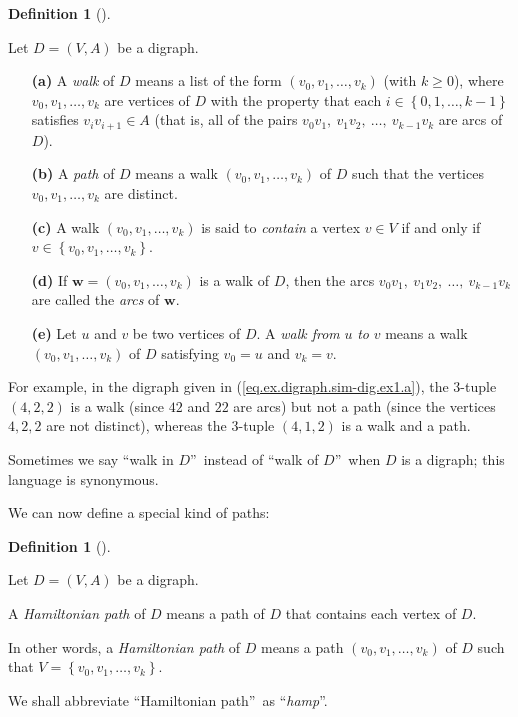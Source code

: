 \documentclass[numbers=enddot,12pt,final,onecolumn,notitlepage]{scrartcl}%
\numberwithin{exer}{subsection}
\theoremstyle{definition}
\newtheorem{defi}[theo]{Definition}
\newenvironment{definition}[1][]
{\begin{defi}[#1]\begin{leftbar}}
{\end{leftbar}\end{defi}}
\begin{document}
\begin{definition}
Let $D=\left(  V,A\right)  $ be a digraph.

\begin{enumerate}
\item[\textbf{(a)}] A \emph{walk} of $D$ means a list of the form $\left(
v_{0},v_{1},\ldots,v_{k}\right)  $ (with $k\geq0$), where $v_{0},v_{1}%
,\ldots,v_{k}$ are vertices of $D$ with the property that each $i\in\left\{
0,1,\ldots,k-1\right\}  $ satisfies $v_{i}v_{i+1}\in A$ (that is, all of the
pairs $v_{0}v_{1},\ v_{1}v_{2},\ \ldots,\ v_{k-1}v_{k}$ are arcs of $D$).

\item[\textbf{(b)}] A \emph{path} of $D$ means a walk $\left(  v_{0}%
,v_{1},\ldots,v_{k}\right)  $ of $D$ such that the vertices $v_{0}%
,v_{1},\ldots,v_{k}$ are distinct.

\item[\textbf{(c)}] A walk $\left(  v_{0},v_{1},\ldots,v_{k}\right)  $ is said
to \emph{contain} a vertex $v\in V$ if and only if $v\in\left\{  v_{0}%
,v_{1},\ldots,v_{k}\right\}  $.

\item[\textbf{(d)}] If $\mathbf{w}=\left(  v_{0},v_{1},\ldots,v_{k}\right)  $
is a walk of $D$, then the arcs $v_{0}v_{1},\ v_{1}v_{2},\ \ldots
,\ v_{k-1}v_{k}$ are called the \emph{arcs} of $\mathbf{w}$.

\item[\textbf{(e)}] Let $u$ and $v$ be two vertices of $D$. A \emph{walk from
}$u$ \emph{to }$v$ means a walk $\left(  v_{0},v_{1},\ldots,v_{k}\right)  $ of
$D$ satisfying $v_{0}=u$ and $v_{k}=v$.
\end{enumerate}
\end{definition}

For example, in the digraph given in (\ref{eq.ex.digraph.sim-dig.ex1.a}), the
$3$-tuple $\left(  4,2,2\right)  $ is a walk (since $42$ and $22$ are arcs)
but not a path (since the vertices $4,2,2$ are not distinct), whereas the
$3$-tuple $\left(  4,1,2\right)  $ is a walk and a path.

Sometimes we say \textquotedblleft walk in $D$\textquotedblright\ instead of
\textquotedblleft walk of $D$\textquotedblright\ when $D$ is a digraph; this
language is synonymous.

We can now define a special kind of paths:

\begin{definition}
Let $D=\left(  V,A\right)  $ be a digraph.

A \emph{Hamiltonian path} of $D$ means a path of $D$ that contains each vertex
of $D$.

In other words, a \emph{Hamiltonian path} of $D$ means a path $\left(
v_{0},v_{1},\ldots,v_{k}\right)  $ of $D$ such that $V=\left\{  v_{0}%
,v_{1},\ldots,v_{k}\right\}  $.

We shall abbreviate \textquotedblleft Hamiltonian path\textquotedblright\ as
\textquotedblleft\emph{hamp}\textquotedblright.
\end{definition}
\end{document}
